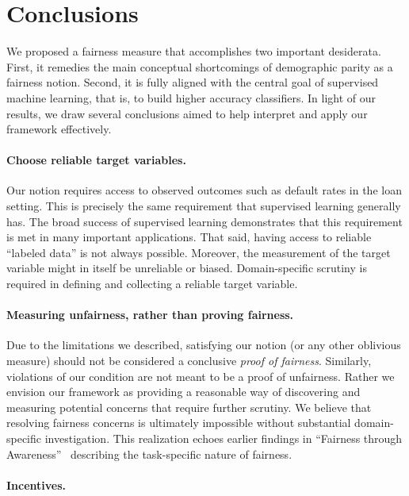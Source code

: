 \section{Conclusions}
%
We proposed a fairness measure that accomplishes two important desiderata.
First, it remedies the main conceptual shortcomings of demographic parity as a
fairness notion. Second, it is fully aligned with the central goal of supervised
machine learning, that is, to build higher accuracy classifiers.
In light of our results, we draw several conclusions aimed to help interpret and
apply our framework effectively.

\paragraph{Choose reliable target variables.}

Our notion requires access to observed outcomes such as default rates in the
loan setting. This is precisely the same requirement that supervised learning
generally has. The broad success of supervised learning demonstrates that this
requirement is met in many important applications. That said, having access
to reliable ``labeled data'' is not always possible. Moreover, the measurement
of the target variable might in itself be unreliable or biased. Domain-specific
scrutiny is required in defining and collecting a reliable target variable.

\paragraph{Measuring unfairness, rather than proving fairness.}

Due to the limitations we described, satisfying our notion (or any other
oblivious measure) should not be considered a conclusive \emph{proof of
fairness}. Similarly, violations of our condition are not meant to be a proof of
unfairness. Rather we envision our framework as providing a reasonable way of
discovering and measuring potential concerns that require further scrutiny. We
believe that resolving fairness concerns is ultimately impossible without
substantial domain-specific investigation. This realization echoes earlier
findings in ``Fairness through Awareness''~\cite{DworkHPRZ12} describing the
task-specific nature of fairness.

\paragraph{Incentives.}

